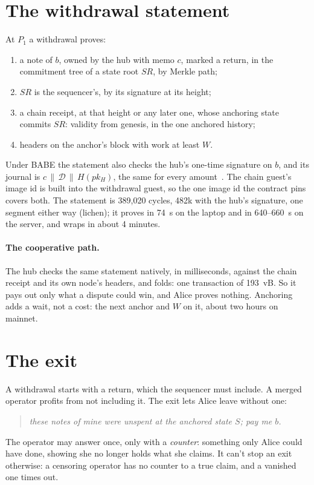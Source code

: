 \documentclass[11pt]{article}
\begin{document}
\section{The withdrawal statement}
\label{sec:withdrawal}

At $P_1$ a withdrawal proves:
\begin{enumerate}[leftmargin=1.5em]
\item a note of $b$, owned by the hub with memo $c$, marked a return, in
  the commitment tree of a state root $\mathit{SR}$, by Merkle path;
\item $\mathit{SR}$ is the sequencer's, by its signature at its height;
\item a chain receipt, at that height or any later one, whose anchoring
  state commits $\mathit{SR}$: validity from genesis, in the one anchored
  history;
\item headers on the anchor's block with work at least $W$.
\end{enumerate}
Under BABE the statement also checks the hub's one-time signature on
$b$, and its journal is $c \,\|\, \mathcal{D} \,\|\, H(pk_H)$, the same for every
amount~\cite{lichenbabe}. The chain guest's image id is built into the
withdrawal guest, so the one image id the contract pins covers both.
The statement is 389,020 cycles, 482k with the hub's signature, one
segment either way (lichen); it proves in 74~s on the laptop and in
640--660~s on the server, and wraps in about 4 minutes.

\paragraph{The cooperative path.} The hub checks the same statement
natively, in milliseconds, against the chain receipt and its own node's
headers, and folds: one transaction of 193~vB. So it pays out only what
a dispute could win, and Alice proves nothing. Anchoring adds a wait,
not a cost: the next anchor and $W$ on it, about two hours on mainnet.

\section{The exit}
\label{sec:exit}

A withdrawal starts with a return, which the sequencer must include. A
merged operator profits from not including it. The exit lets Alice leave
without one:
\begin{quote}
\emph{these notes of mine were unspent at the anchored state $S$; pay me
$b$.}
\end{quote}
The operator may answer once, only with a \emph{counter}: something only
Alice could have done, showing she no longer holds what she claims. It
can't stop an exit otherwise: a censoring operator has no counter to a
true claim, and a vanished one times out.
\end{document}
